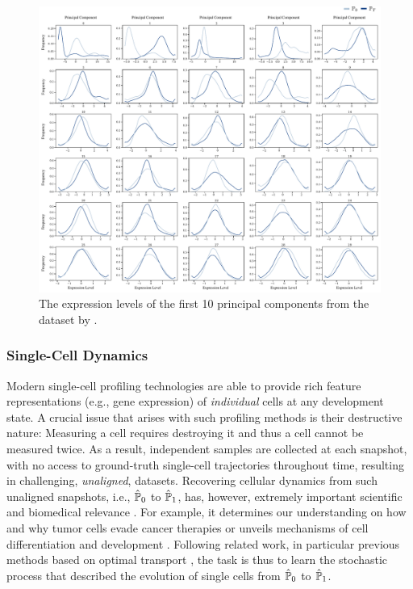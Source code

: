 \begin{figure}
     \centering
         \centering
         \includegraphics[width=\textwidth]{figures/fig_marginals_schiebinger_pcs_cropped.pdf}
         \caption{The expression levels of the first 10 principal components from the dataset by \citet{schiebinger2019optimal}.}
\label{fig:gaussianMain}
\end{figure}

\subsubsection{Single-Cell Dynamics}

 Modern single-cell profiling technologies are able to provide rich feature representations (e.g., gene expression) of \textit{individual} cells at any development state. A crucial issue that arises with such profiling methods is their destructive nature: Measuring a cell requires destroying it and thus a cell cannot be measured twice. As a result, independent samples are collected at each snapshot, with no access to ground-truth single-cell trajectories throughout time, resulting in challenging, \emph{unaligned}, datasets.
Recovering cellular dynamics from such unaligned snapshots, i.e., $\hat{\mathbb{P}}_{ {0} }$ to $\hat{\mathbb{P}}_{ {1}}$, has, however, extremely important scientific and biomedical relevance \citep{kulkarni2019beyond}. For example, it determines our understanding on how and why tumor cells evade cancer therapies \citep{frangieh2021multimodal} or unveils mechanisms of cell differentiation and development \citep{schiebinger2019optimal}. Following related work, in particular previous methods based on optimal transport \citep{schiebinger2019optimal, bunne2021learning, bunne2022supervised, tong2020trajectorynet}, the task is thus to learn the stochastic process that described the evolution of single cells from $\hat{\mathbb{P}}_{ {0} }$ to $\hat{\mathbb{P}}_{ {1}}$.

